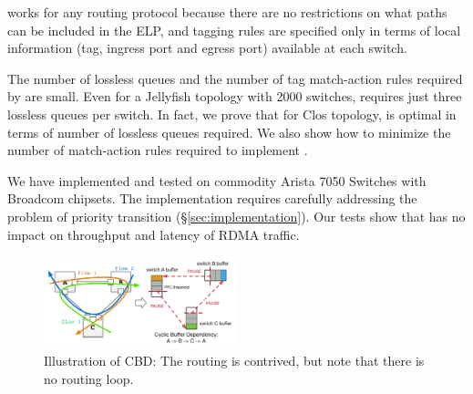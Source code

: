 \sysname{} works for any routing protocol because there are no restrictions on what
paths can be included in the ELP, and tagging rules are specified only in terms
of local information (tag, ingress port and egress port) available at each
switch. 

The number of lossless queues and the number of tag match-action rules required
by \sysname{} are small.  Even for a Jellyfish topology with 2000 switches,
\sysname{} requires just three lossless queues per switch.  In fact, we prove
that for Clos topology,  \sysname{} is optimal in terms of number of lossless
queues required.  We also show how to minimize the number of match-action rules
required to implement \sysname{}.

We have implemented and tested \sysname{} on commodity Arista 7050 Switches with
Broadcom chipsets. The implementation requires carefully addressing the problem
of priority transition (\S\ref{sec:implementation}). Our tests show that
\sysname{} has no impact on throughput and latency of RDMA traffic.

\begin{figure}
	\centering
	\includegraphics[width=0.5\textwidth] {figs/deadlock}
	\vspace{-0.15in}
	\caption{Illustration of CBD: The routing is contrived, but note that there is no routing loop.}
	\vspace{-0.15in}
	\label{fig:deadlock_example}
\end{figure}
